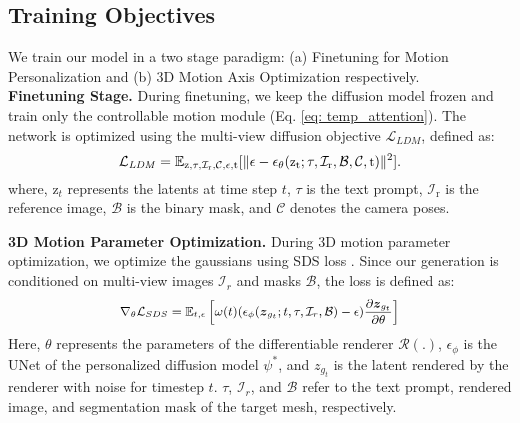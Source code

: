  

\subsection{Training Objectives}
\label{sec: training_objectives}
We train our model in a two stage paradigm: (a) Finetuning for Motion Personalization and (b) 3D Motion Axis Optimization respectively.\\
\noindent\textbf{Finetuning Stage.} During finetuning, we keep the diffusion model frozen and train only the controllable motion module (Eq. \ref{eq: temp_attention}). The network is optimized using the multi-view diffusion objective $\mathcal{L}_{LDM}$, defined as:
\begin{equation}
\small
\mathcal{L}_{\text{\textit{LDM}}} = \mathbb{E}_{\text{z}, \tau, \mathcal{I}_{\text{r}}, \mathcal{C}, \epsilon, \text{t}} [\|\epsilon - \epsilon_{\theta}(\text{z}_\text{t}; \tau, \mathcal{I}_\text{r}, \mathcal{B}, \mathcal{C}, \text{t})\|^2].
\label{eq:l_ldm}
\end{equation}
where, $\text{z}_{t}$ represents the latents at time step $t$, $\tau$ is the text prompt, $\mathcal{I}_{\text{r}}$ is the reference image, $\mathcal{B}$ is the binary mask, and $\mathcal{C}$ denotes the camera poses.

\noindent\textbf{3D Motion Parameter Optimization.} During 3D motion parameter optimization, we optimize the gaussians using SDS loss \cite{poole2022dreamfusion}. Since our generation is conditioned on multi-view images $\mathcal{I}_{r}$ and masks $\mathcal{B}$, the loss is defined as:
\begin{equation}
\small
    \nabla_{\theta} \mathcal{L}_{SDS} = \mathbb{E}_{t, \epsilon} \left [ \omega(t)(\epsilon_\phi(\boldsymbol{z}_{g_t}; t, \tau, \mathcal{I}_{r}, \mathcal{B}) - \epsilon) \frac{\partial \boldsymbol{z}_{g_t}}{\partial \theta}\right ]
    \label{eq: sds_actual}
\end{equation}
Here, $\theta$ represents the parameters of the differentiable renderer $\mathcal{R}(.)$, $\epsilon_{\phi}$ is the UNet of the personalized diffusion model $\psi^{*}$, and $z_{g_{t}}$ is the latent rendered by the renderer with noise for timestep $t$. $\tau$, $\mathcal{I}_{r}$, and $\mathcal{B}$ refer to the text prompt, rendered image, and segmentation mask of the target mesh, respectively.

